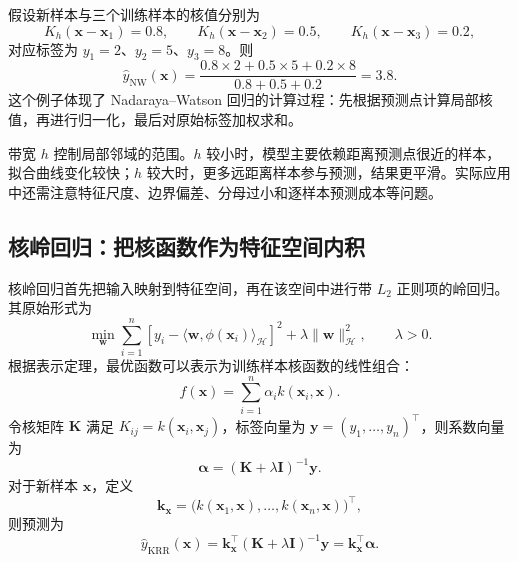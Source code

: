 \documentclass[UTF8,zihao=-4,openany]{ctexbook}
\begin{document}
假设新样本与三个训练样本的核值分别为
\[
  K_h(\boldsymbol{x}-\boldsymbol{x}_1)=0.8,\qquad
  K_h(\boldsymbol{x}-\boldsymbol{x}_2)=0.5,\qquad
  K_h(\boldsymbol{x}-\boldsymbol{x}_3)=0.2,
\]
对应标签为 $y_1=2$、$y_2=5$、$y_3=8$。则
\[
  \widehat y_{\mathrm{NW}}(\boldsymbol{x})
  =
  \frac{0.8\times2+0.5\times5+0.2\times8}{0.8+0.5+0.2}
  =3.8.
\]
这个例子体现了 Nadaraya--Watson 回归的计算过程：先根据预测点计算局部核值，再进行归一化，最后对原始标签加权求和。


带宽 $h$ 控制局部邻域的范围。$h$ 较小时，模型主要依赖距离预测点很近的样本，拟合曲线变化较快；$h$ 较大时，更多远距离样本参与预测，结果更平滑。实际应用中还需注意特征尺度、边界偏差、分母过小和逐样本预测成本等问题。

\subsection{核岭回归：把核函数作为特征空间内积}

核岭回归首先把输入映射到特征空间，再在该空间中进行带 $L_2$ 正则项的岭回归。其原始形式为
\begin{equation}
  \min_{\boldsymbol w}
  \sum_{i=1}^{n}
  \left[
    y_i-
    \langle\boldsymbol w,\phi(\boldsymbol{x}_i)\rangle_{\mathcal H}
  \right]^2
  +
  \lambda\|\boldsymbol w\|_{\mathcal H}^{2},
  \qquad \lambda>0.
  \label{eq:krr-primal}
\end{equation}
根据表示定理，最优函数可以表示为训练样本核函数的线性组合：
\begin{equation}
  f(\boldsymbol{x})
  =
  \sum_{i=1}^{n}\alpha_i k(\boldsymbol{x}_i,\boldsymbol{x}).
  \label{eq:krr-representer}
\end{equation}
令核矩阵 $\boldsymbol K$ 满足
$K_{ij}=k(\boldsymbol{x}_i,\boldsymbol{x}_j)$，标签向量为
$\boldsymbol y=(y_1,\ldots,y_n)^\top$，则系数向量为
\begin{equation}
  \boldsymbol\alpha
  =
  (\boldsymbol K+\lambda\boldsymbol I)^{-1}\boldsymbol y.
  \label{eq:krr-alpha}
\end{equation}
对于新样本 $\boldsymbol{x}$，定义
\[
  \boldsymbol k_{\boldsymbol{x}}
  =
  \bigl(
  k(\boldsymbol{x}_1,\boldsymbol{x}),
  \ldots,
  k(\boldsymbol{x}_n,\boldsymbol{x})
  \bigr)^\top,
\]
则预测为
\begin{equation}
  \widehat y_{\mathrm{KRR}}(\boldsymbol{x})
  =
  \boldsymbol k_{\boldsymbol{x}}^\top
  (\boldsymbol K+\lambda\boldsymbol I)^{-1}\boldsymbol y
  =
  \boldsymbol k_{\boldsymbol{x}}^\top\boldsymbol\alpha.
  \label{eq:krr-prediction}
\end{equation}
\end{document}

